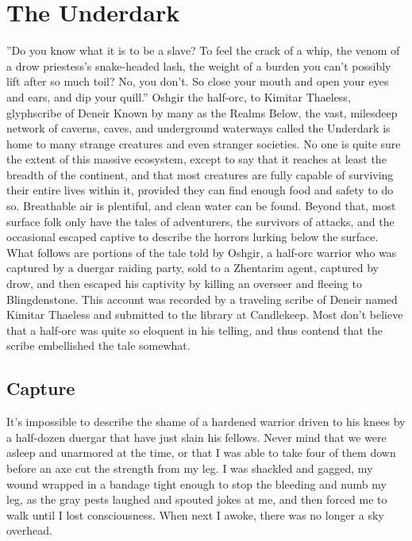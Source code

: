 \documentclass[10pt,a4paper,twoside,twocolumn,openany,bg=print,nodeprecatedcode]{dndbook}
\begin{document}
\section{The Underdark}
\DndQuote%
{}
{''Do you know what it is to be a slave? To feel the crack of a whip, the venom of a drow priestess's snake-headed lash, the weight of a burden you can't possibly lift after so much toil? No, you don't. So close your mouth and open your eyes and ears, and dip your quill.''}
{Oshgir the half-orc, to Kimitar Thaeless, glyphscribe of Deneir}
Known by many as the Realms Below, the vast, milesdeep network of caverns, caves, and underground waterways called the Underdark is home to many strange creatures and even stranger societies. No one is quite sure the extent of this massive ecosystem, except to say that it reaches at least the breadth of the continent, and that most creatures are fully capable of surviving their entire lives within it, provided they can find enough food and safety to do so. Breathable air is plentiful, and clean water can be found. Beyond that, most surface folk only have the tales of adventurers, the survivors of attacks, and the occasional escaped captive to describe the horrors lurking below the surface.
What follows are portions of the tale told by Oshgir, a half-orc warrior who was captured by a duergar raiding party, sold to a Zhentarim agent, captured by drow, and then escaped his captivity by killing an overseer and fleeing to Blingdenstone. This account was recorded by a traveling scribe of Deneir named Kimitar Thaeless and submitted to the library at Candlekeep. Most don't believe that a half-orc was quite so eloquent in his telling, and thus contend that the scribe embellished the tale somewhat.
\subsection{Capture}
It's impossible to describe the shame of a hardened warrior driven to his knees by a half-dozen duergar that have just slain his fellows. Never mind that we were asleep and unarmored at the time, or that I was able to take four of them down before an axe cut the strength from my leg. I was shackled and gagged, my wound wrapped in a bandage tight enough to stop the bleeding and numb my leg, as the gray pests laughed and spouted jokes at me, and then forced me to walk until I lost consciousness. When next I awoke, there was no longer a sky overhead.
\end{document}
